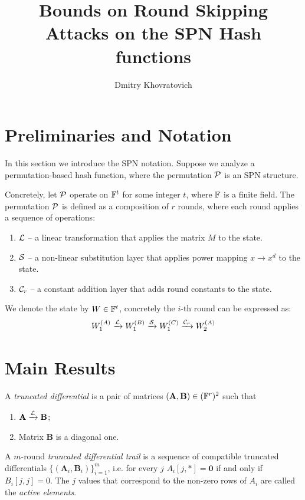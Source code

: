\documentclass[11pt]{article}
\title{Bounds on Round Skipping Attacks on the SPN Hash functions}
\author{Dmitry Khovratovich}
\date{}
\begin{document}
\maketitle

\section{Preliminaries and Notation}

In this section we introduce the SPN notation. Suppose we analyze a permutation-based hash function, where the permutation $\mathcal{P}$ is an SPN structure.

Concretely, let $\mathcal{P}$ operate on $\mathbb{F}^t$ for some integer $t$, where $\mathbb{F}$ is a finite field.
The permutation $\mathcal{P}$ is defined as a composition of $r$ rounds, where each round applies a
sequence of operations:
\begin{enumerate}
    \item $\mathcal{L}$ -- a linear transformation that applies the matrix $M$ to the state.
    \item $\mathcal{S}$ -- a non-linear substitution layer that applies power mapping $x\rightarrow x^d$ to the state.
    \item $\mathcal{C}_r$ -- a constant addition layer that adds  round constants to the state.
\end{enumerate}
We denote the state by $W\in \mathbb{F}^t$, concretely the $i$-th round can be expressed as:
$$
W_1^{(A)}\xrightarrow{\mathcal{L}}W_1^{(B)}\xrightarrow{\mathcal{S}}W_1^{(C)}\xrightarrow{\mathcal{C}_r}W_2^{(A)}
$$


\section{Main Results}


\begin{definition}
    A \emph{  truncated differential} is a pair of matrices $(\mathbf{A},\mathbf{B})\in(\mathbb{F}^r)^2$ such that
\begin{enumerate}
    \item $
    \mathbf{A} \xrightarrow{\mathcal{L}}\mathbf{B}
    $;
    \item Matrix $\mathbf{B}$ is a diagonal one.
\end{enumerate}
\end{definition}

\begin{definition}
    A $m$-round \emph{truncated differential   trail} is a sequence of compatible   truncated differentials $\{(\mathbf{A}_i,\mathbf{B}_i)\}_{i=1}^m$,
    i.e.
for every $j$   $A_i[j,*]=\mathbf{0}$ if and only if $B_i[j,j]=0$. The $j$ values that correspond to the non-zero rows of $A_i$ are called
the \emph{active elements}.
 \end{definition}
\end{document}
